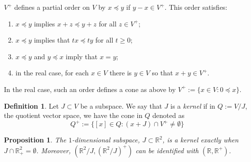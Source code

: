 \documentclass[11pt]{amsart}
\newtheorem{prop}[thm]{Proposition}
\theoremstyle{definition}
\newtheorem{defn}[thm]{Definition}
\def\bb{\mathbb}
\begin{document}
$V^+$ defines a partial order on $V$ by $x\preceq y$ if $y -x \in V^+$. This order satisfies:
\begin{enumerate}
    \item $x\preceq y$ implies $x+z\preceq y+z$ for all $z\in V^+$;
    \item $x\preceq y$ implies that $tx \preceq ty$ for all $t\geq 0$;
    \item $x\preceq y$ and $y\preceq x$ imply that $x=y$;
    \item in the real case, for each $x\in V$ there is $y\in V$ so that $x+y\in V^+$.
\end{enumerate}

In the real case, such an order defines a cone as above by $V^+ := \{x\in V : 0\preceq x\}$.

\begin{defn}
    Let $J\subset V$ be a subspace. We say that $J$ is a \emph{kernel} if in $Q := V/J$, the quotient vector space, we have the cone in $Q$ denoted as
    \[Q^+ := \{[x] \in Q : (x+J)\cap V^+\not= \emptyset\}\]
\end{defn}

\begin{prop}
    The $1$-dimensional subspace, $J\subset \bb R^2$, is a kernel exactly when $J\cap \bb R_+^2 = \emptyset$. Moreover, $(\bb R^2/J, (\bb R^2/J)^+)$ can be identified with $(\bb R, \bb R^+)$.
\end{prop}
\end{document}

